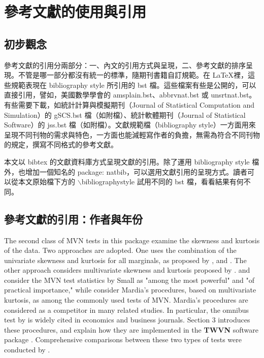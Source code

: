 %
\chapter{參考文獻的使用與引用}
\section{初步觀念}
參考文獻的引用分兩部分：一、內文的引用方式與呈現，二、參考文獻的排序呈現。不管是哪一部分都沒有統一的標準，隨期刊書籍自訂規範。在   \LaTeX 裡，這些規範表現在 bibliography style 所引用的 bst 檔。這些檔案有些是公開的，可以直接引用，譬如，美國數學學會的 amsplain.bst、abbrvnat.bst 或 unsrtnat.bst。有些需要下載，如統計計算與模擬期刊（Journal of Statistical Computation and Simulation）的 gSCS.bst 檔（如附檔）、統計軟體期刊（Journal of Statistical Software）的 jss.bst 檔（如附檔）。文獻規範檔（bibliography style）一方面用來呈現不同刊物的需求與特色，一方面也能減輕寫作者的負擔，無需為符合不同刊物的規定，撰寫不同格式的參考文獻。

本文以 bibtex 的文獻資料庫方式呈現文獻的引用。除了運用 bibliography style 檔外，也增加一個知名的 package: natbib，可以選用文獻引用的呈現方式。讀者可以從本文原始檔下方的 $\backslash$bibliographystyle  試用不同的 bst 檔，看看結果有何不同。

\section{參考文獻的引用：作者與年份}
The second class of MVN tests in this package examine the skewness and kurtosis of the data. Two approaches are adopted. One uses the combination of the univariate skewness and kurtosis for all marginals, as proposed by \cite{SMALL:1980}, and \cite{DOORNIK:2008}. The other approach considers multivariate skewness and kurtosis proposed by \cite{MARDIA:1970}.   \cite{FOSTER:1981} and \cite{HORSWELL:1990} consider the MVN test statistics by Small as "among the most powerful" and "of practical importance,"  while \cite{MM} consider Mardia's procedures, based on multivariate kurtosis, as among the commonly used tests of MVN.  Mardia's procedures are considered as a competitor  in many related studies.
In particular, the omnibus test by \cite{DOORNIK:2008} is widely cited in economics and business journals. Section 3 introduces these procedures, and explain how they are implemented in the \textbf{TWVN} software package \cite{WH}. Comprehensive  comparisons between these two types of tests were conducted by \cite{HORSWELL:1992}.

